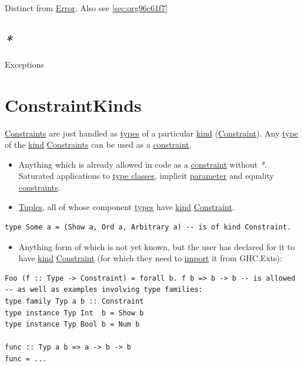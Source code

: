 \documentclass[a4paper,14pt,oneside]{book}
\begin{document}
Distinct from \hyperref[org6a8f0ef]{Error}. Also see \ref{sec:org96c61f7}

\section{\emph{*}}
\label{sec:org4e13266}

\label{org4a1b6e5}Exceptions

\chapter{\label{orgba0ad65}ConstraintKinds}
\label{sec:orgfc2b3aa}
\hyperref[org4763063]{Constraints} are just handled as \hyperref[org2f600ac]{types} of a particular \hyperref[orgbe6abb8]{kind} (\hyperref[org5110a7a]{Constraint}).
Any \hyperref[orge4c0722]{type} of the \hyperref[orgbe6abb8]{kind} \hyperref[org4763063]{Constraints} can be used as a \hyperref[org5110a7a]{constraint}.
\begin{itemize}
\item Anything which is already allowed in code as a \hyperref[org5110a7a]{constraint} without \emph{*}. Saturated applications to \hyperref[orga64aa94]{type classes}, implicit \hyperref[org405df8b]{parameter} and equality \hyperref[org4763063]{constraints}.
\item \hyperref[orgea20e8e]{Tuples}, all of whose component \hyperref[org2f600ac]{types} have \hyperref[orgbe6abb8]{kind} \hyperref[org5110a7a]{Constraint}.
\end{itemize}
\begin{verbatim}
type Some a = (Show a, Ord a, Arbitrary a) -- is of kind Constraint.
\end{verbatim}
\begin{itemize}
\item Anything form of which is not yet known, but the user has declared for it to have \hyperref[orgbe6abb8]{kind} \hyperref[org5110a7a]{Constraint} (for which they need to \hyperref[org8190d07]{import} it from GHC.Exts):
\end{itemize}
\begin{verbatim}
Foo (f :: Type -> Constraint) = forall b. f b => b -> b -- is allowed
-- as well as examples involving type families:
type family Typ a b :: Constraint
type instance Typ Int  b = Show b
type instance Typ Bool b = Num b

func :: Typ a b => a -> b -> b
func = ...
\end{verbatim}
\end{document}
